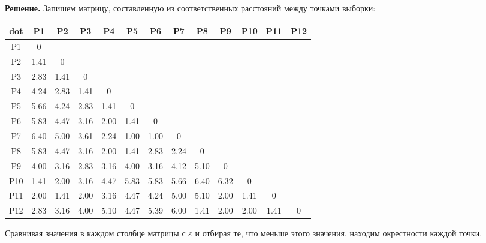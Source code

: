 \textbf{Решение.}
Запишем матрицу, составленную из соответственных расстояний между точками выборки:
\begin{center}
    \begin{tabular}{ |c|c|c|c|c|c|c|c|c|c|c|c|c|}
        \hline
        dot & P1   & P2   & P3   & P4   & P5   & P6   & P7   & P8   & P9   & P10  & P11  & P12 \\ \hline
        P1  & 0    &      &      &      &      &      &      &      &      &      &      &     \\ \hline
        P2  & 1.41 & 0    &      &      &      &      &      &      &      &      &      &     \\ \hline
        P3  & 2.83 & 1.41 & 0    &      &      &      &      &      &      &      &      &     \\ \hline
        P4  & 4.24 & 2.83 & 1.41 & 0    &      &      &      &      &      &      &      &     \\ \hline
        P5  & 5.66 & 4.24 & 2.83 & 1.41 & 0    &      &      &      &      &      &      &     \\ \hline
        P6  & 5.83 & 4.47 & 3.16 & 2.00 & 1.41 & 0    &      &      &      &      &      &     \\ \hline
        P7  & 6.40 & 5.00 & 3.61 & 2.24 & 1.00 & 1.00 & 0    &      &      &      &      &     \\ \hline
        P8  & 5.83 & 4.47 & 3.16 & 2.00 & 1.41 & 2.83 & 2.24 & 0    &      &      &      &     \\ \hline
        P9  & 4.00 & 3.16 & 2.83 & 3.16 & 4.00 & 3.16 & 4.12 & 5.10 & 0    &      &      &     \\ \hline
        P10 & 1.41 & 2.00 & 3.16 & 4.47 & 5.83 & 5.83 & 5.66 & 6.40 & 6.32 & 0    &      &     \\ \hline
        P11 & 2.00 & 1.41 & 2.00 & 3.16 & 4.47 & 4.24 & 5.00 & 5.10 & 2.00 & 1.41 & 0    &     \\ \hline
        P12 & 2.83 & 3.16 & 4.00 & 5.10 & 4.47 & 5.39 & 6.00 & 1.41 & 2.00 & 2.00 & 1.41 & 0   \\ \hline
    \end{tabular}
\end{center}
Сравнивая значения в каждом столбце матрицы с $\varepsilon$ и отбирая те, что меньше этого значения, находим окрестности каждой точки.

